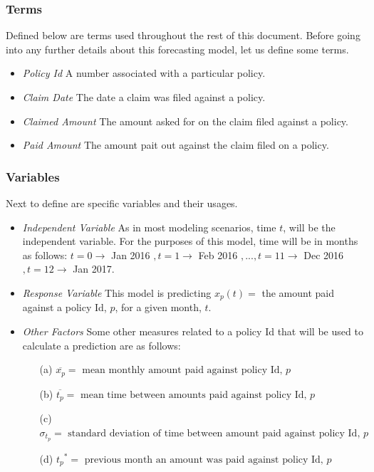 \documentclass[12pt,letterpaper,titlepage]{article}
\begin{document}
			\subsubsection{Terms}
				Defined below are terms used throughout the rest of this document. Before going into any further details about this forecasting model, let us define some terms.
				\begin{itemize}
					\item \emph{Policy Id} A number associated with a particular policy.
					\item \emph{Claim Date} The date a claim was filed against a policy.
					\item \emph{Claimed Amount} The amount asked for on the claim filed against a policy.
					\item \emph{Paid Amount} The amount pait out against the claim filed on a policy.				
				\end{itemize}
				
			\subsubsection{Variables}
				Next to define are specific variables and their usages.
				\begin{itemize}
					\item \emph{Independent Variable} As in most modeling scenarios, time $t$, will be the independent variable. For the purposes of this model, time will be in months as follows: $t = 0 \rightarrow $ Jan 2016 $, t = 1 \rightarrow $ Feb 2016 $,..., t = 11 \rightarrow $ Dec 2016 $, t = 12 \rightarrow $ Jan 2017.
				
					\item \emph{Response Variable} This model is predicting $x_p(t) = $ the amount paid against a policy Id, $p$, for a given month, $t$. 
				
					\item \emph{Other Factors} Some other measures related to a policy Id that will be used to calculate a prediction are as follows:
						\begin{itemize}\label{eq:ofEq}
							\item[(a)] $\overline{x_p} = \text{ mean monthly amount paid against policy Id, } p$
							
							\item[(b)] $\overline{t_p} = \text{ mean time between amounts paid against policy Id, } p$
							
							\item[(c)] $\sigma_{t_p} = \text{ standard deviation of time between amount paid against policy Id, } p $
							
							\item[(d)] ${t_p}^{*} = \text{ previous month an amount was paid against policy Id, } p$
						\end{itemize}
				 \end{itemize}
\end{document}
